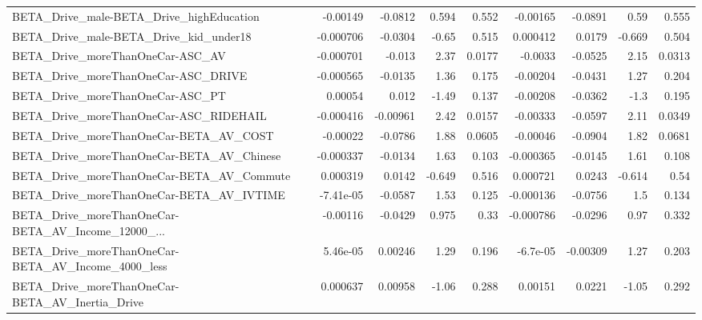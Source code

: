 \begin{tabular}{lrrrrrrrr}
BETA\_Drive\_male-BETA\_Drive\_highEducation           &    -0.00149 &      -0.0812 &    0.594 &    0.552 &   -0.00165 &     -0.0891 &         0.59 &         0.555 \\
BETA\_Drive\_male-BETA\_Drive\_kid\_under18             &   -0.000706 &      -0.0304 &    -0.65 &    0.515 &   0.000412 &      0.0179 &       -0.669 &         0.504 \\
BETA\_Drive\_moreThanOneCar-ASC\_AV                   &   -0.000701 &       -0.013 &     2.37 &   0.0177 &    -0.0033 &     -0.0525 &         2.15 &        0.0313 \\
BETA\_Drive\_moreThanOneCar-ASC\_DRIVE                &   -0.000565 &      -0.0135 &     1.36 &    0.175 &   -0.00204 &     -0.0431 &         1.27 &         0.204 \\
BETA\_Drive\_moreThanOneCar-ASC\_PT                   &     0.00054 &        0.012 &    -1.49 &    0.137 &   -0.00208 &     -0.0362 &         -1.3 &         0.195 \\
BETA\_Drive\_moreThanOneCar-ASC\_RIDEHAIL             &   -0.000416 &     -0.00961 &     2.42 &   0.0157 &   -0.00333 &     -0.0597 &         2.11 &        0.0349 \\
BETA\_Drive\_moreThanOneCar-BETA\_AV\_COST             &    -0.00022 &      -0.0786 &     1.88 &   0.0605 &   -0.00046 &     -0.0904 &         1.82 &        0.0681 \\
BETA\_Drive\_moreThanOneCar-BETA\_AV\_Chinese          &   -0.000337 &      -0.0134 &     1.63 &    0.103 &  -0.000365 &     -0.0145 &         1.61 &         0.108 \\
BETA\_Drive\_moreThanOneCar-BETA\_AV\_Commute          &    0.000319 &       0.0142 &   -0.649 &    0.516 &   0.000721 &      0.0243 &       -0.614 &          0.54 \\
BETA\_Drive\_moreThanOneCar-BETA\_AV\_IVTIME           &   -7.41e-05 &      -0.0587 &     1.53 &    0.125 &  -0.000136 &     -0.0756 &          1.5 &         0.134 \\
BETA\_Drive\_moreThanOneCar-BETA\_AV\_Income\_12000\_... &    -0.00116 &      -0.0429 &    0.975 &     0.33 &  -0.000786 &     -0.0296 &         0.97 &         0.332 \\
BETA\_Drive\_moreThanOneCar-BETA\_AV\_Income\_4000\_less &    5.46e-05 &      0.00246 &     1.29 &    0.196 &   -6.7e-05 &    -0.00309 &         1.27 &         0.203 \\
BETA\_Drive\_moreThanOneCar-BETA\_AV\_Inertia\_Drive    &    0.000637 &      0.00958 &    -1.06 &    0.288 &    0.00151 &      0.0221 &        -1.05 &         0.292 \\

\end{tabular}
